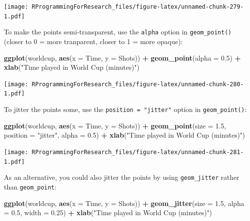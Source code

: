 \documentclass[]{book}
\makeatletter
\newenvironment{Shaded}{\begin{snugshade}}{\end{snugshade}}
\newcommand{\KeywordTok}[1]{\textcolor[rgb]{0.13,0.29,0.53}{\textbf{#1}}}
\newcommand{\DataTypeTok}[1]{\textcolor[rgb]{0.13,0.29,0.53}{#1}}
\newcommand{\FloatTok}[1]{\textcolor[rgb]{0.00,0.00,0.81}{#1}}
\newcommand{\StringTok}[1]{\textcolor[rgb]{0.31,0.60,0.02}{#1}}
\newcommand{\OperatorTok}[1]{\textcolor[rgb]{0.81,0.36,0.00}{\textbf{#1}}}
\newcommand{\NormalTok}[1]{#1}
\newenvironment{kframe}{%
\medskip{}
\setlength{\fboxsep}{.8em}
 \def\at@end@of@kframe{}%
 \ifinner\ifhmode%
  \def\at@end@of@kframe{\end{minipage}}%
  \begin{minipage}{\columnwidth}%
 \fi\fi%
 \def\FrameCommand##1{\hskip\@totalleftmargin \hskip-\fboxsep
 \colorbox{shadecolor}{##1}\hskip-\fboxsep
     \hskip-\linewidth \hskip-\@totalleftmargin \hskip\columnwidth}%
 \MakeFramed {\advance\hsize-\width
   \@totalleftmargin\z@ \linewidth\hsize
   \@setminipage}}%
 {\par\unskip\endMakeFramed%
 \at@end@of@kframe}
\renewenvironment{Shaded}{\begin{kframe}}{\end{kframe}}
\theoremstyle{definition}
\theoremstyle{definition}
\theoremstyle{definition}
\theoremstyle{remark}
\makeatother
\begin{document}
\texttt{[image: RProgrammingForResearch\_files/figure-latex/unnamed-chunk-279-1.pdf]}

To make the points semi-transparent, use the \texttt{alpha} option in
\texttt{geom\_point()} (closer to 0 = more tranparent, closer to 1 =
more opaque):

\begin{Shaded}
\begin{Highlighting}[]
\KeywordTok{ggplot}\NormalTok{(worldcup, }\KeywordTok{aes}\NormalTok{(}\DataTypeTok{x =}\NormalTok{ Time, }\DataTypeTok{y =}\NormalTok{ Shots)) }\OperatorTok{+}
\StringTok{        }\KeywordTok{geom_point}\NormalTok{(}\DataTypeTok{alpha =} \FloatTok{0.5}\NormalTok{)  }\OperatorTok{+}\StringTok{ }
\StringTok{        }\KeywordTok{xlab}\NormalTok{(}\StringTok{"Time played in World Cup (minutes)"}\NormalTok{)}
\end{Highlighting}
\end{Shaded}

\texttt{[image: RProgrammingForResearch\_files/figure-latex/unnamed-chunk-280-1.pdf]}

To jitter the points some, use the \texttt{position\ =\ "jitter"} option
in \texttt{geom\_point()}:

\begin{Shaded}
\begin{Highlighting}[]
\KeywordTok{ggplot}\NormalTok{(worldcup, }\KeywordTok{aes}\NormalTok{(}\DataTypeTok{x =}\NormalTok{ Time, }\DataTypeTok{y =}\NormalTok{ Shots)) }\OperatorTok{+}
\StringTok{        }\KeywordTok{geom_point}\NormalTok{(}\DataTypeTok{size =} \FloatTok{1.5}\NormalTok{, }\DataTypeTok{position =} \StringTok{"jitter"}\NormalTok{,}
                   \DataTypeTok{alpha =} \FloatTok{0.5}\NormalTok{)  }\OperatorTok{+}\StringTok{ }
\StringTok{        }\KeywordTok{xlab}\NormalTok{(}\StringTok{"Time played in World Cup (minutes)"}\NormalTok{)}
\end{Highlighting}
\end{Shaded}

\texttt{[image: RProgrammingForResearch\_files/figure-latex/unnamed-chunk-281-1.pdf]}

As an alternative, you could also jitter the points by using
\texttt{geom\_jitter} rather than \texttt{geom\_point}:

\begin{Shaded}
\begin{Highlighting}[]
\KeywordTok{ggplot}\NormalTok{(worldcup, }\KeywordTok{aes}\NormalTok{(}\DataTypeTok{x =}\NormalTok{ Time, }\DataTypeTok{y =}\NormalTok{ Shots)) }\OperatorTok{+}
\StringTok{        }\KeywordTok{geom_jitter}\NormalTok{(}\DataTypeTok{size =} \FloatTok{1.5}\NormalTok{, }\DataTypeTok{alpha =} \FloatTok{0.5}\NormalTok{, }\DataTypeTok{width =} \FloatTok{0.25}\NormalTok{)  }\OperatorTok{+}\StringTok{ }
\StringTok{        }\KeywordTok{xlab}\NormalTok{(}\StringTok{"Time played in World Cup (minutes)"}\NormalTok{)}
\end{Highlighting}
\end{Shaded}
\end{document}
